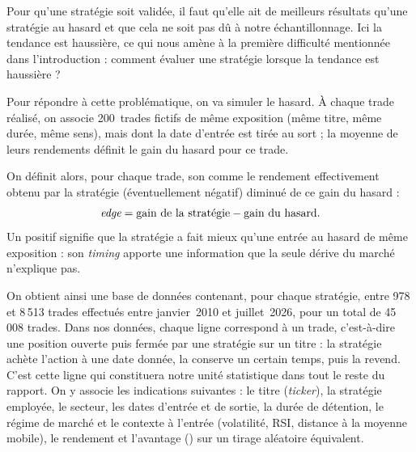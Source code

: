 Pour qu'une stratégie soit validée, il faut qu'elle ait de meilleurs
résultats qu'une stratégie au hasard et que cela ne soit pas dû à
notre échantillonnage.
Ici la tendance est haussière, ce qui nous amène à la première
difficulté mentionnée dans l'introduction : comment évaluer une 
stratégie lorsque la tendance est haussière ?

Pour répondre à cette problématique, on va simuler le hasard.
À chaque trade réalisé, on associe 200~trades fictifs de même exposition
(même titre, même durée, même sens), mais dont la date
d'entrée est tirée au sort ; la moyenne de leurs rendements définit le
gain du hasard pour ce trade.

On définit alors, pour chaque trade, son \edgevar{} comme le rendement
effectivement obtenu par la stratégie (éventuellement négatif) diminué de
ce gain du hasard :
\[
  \textit{edge} = \text{gain de la stratégie} - \text{gain du hasard}.
\]
Un \edgevar{} positif signifie que la stratégie a fait mieux qu'une entrée
au hasard de même exposition : son \emph{timing} apporte une information
que la seule dérive du marché n'explique pas.

On obtient ainsi une base de données contenant, pour chaque stratégie,
entre 978 et 8\,513 trades effectués entre janvier~2010 et juillet~2026,
pour un total de 45\,008 trades.
Dans nos données, chaque ligne correspond à un trade, c'est-à-dire une
position ouverte puis fermée par une stratégie sur un titre : la stratégie
achète l'action à une date donnée, la conserve un certain temps, puis la
revend. C'est cette ligne qui constituera notre unité statistique dans tout
le reste du rapport.
On y associe les indications suivantes : le titre
(\emph{ticker}), la stratégie employée, le secteur, les dates d'entrée et de
sortie, la durée de détention, le régime de marché et le contexte à l'entrée
(volatilité, RSI, distance à la moyenne mobile), le rendement et l'avantage
(\edgevar{}) sur un tirage aléatoire équivalent.

